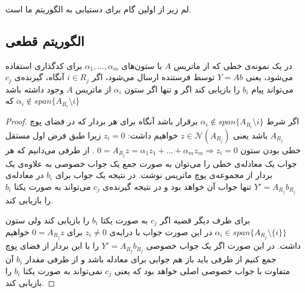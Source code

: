 \subsubsection{}
لم زیر از
\cite{7176784}
اولین گام برای دستیابی به الگوریتم ما است.
\subsection{
	الگوریتم قطعی
	}
\begin{lemma}
	\label{lemma:algebraicconstraint}
	در یک نمونه‌ی
	\picod
	خطی که از ماتریس
	$A$
	با ستون‌های 
	$\alpha_1, \ldots, \alpha_m$
	برای کدگذاری استفاده می‌شود، یعنی
	$Y = A b$
	توسط فرستنده ارسال می‌شود، اگر
	$i \in R_j$
	آنگاه، گیرنده‌‌ی 
	$c_j$
	می‌تواند پیام 
	$b_i$
	را بازیابی کند اگر و تنها اگر ستون
	$\alpha_i$
	از ماتریس
	$A$
	وجود داشته باشد که
	$\alpha_i \notin span\{A_{R_i} \setminus i\}$
\end{lemma}
\begin{proof}
	اگر شرط
		$\alpha_i \notin span\{A_{R_i} \setminus i\}$
		برقرار باشد آنگاه برای هر بردار که در فضای پوچ
		$A_{R_j}$
		باشد یعنی
		$z \in \mathcal{N}(A_{R_j})$
		خواهیم داشت:
		$z_i = 0$
		زیرا طبق فرض اول مستقل خطی بودن ستون
		$0 = A_{R_j} z  = \alpha_1 z_1 + \ldots + \alpha_m z_m \Rightarrow z_i = 0$
		.  از طرفی می‌دانیم که هر جواب یک معادله‌ی خطی را می‌توان به صورت جمع یک جواب خصوصی به علاوه‌ی یک بردار از مجموعه‌ی پوچ ماتریس نوشت. در نتیجه یک جواب برای 
		$b_i$
		در معادله‌ی
		$Y' = A_{R_j} b_{R_j}$
		تنها جواب آن خواهد بود و در نتیجه گیرنده‌ی
		$c_j$
		می‌تواند به صورت یکتا
		$b_i$
		را بازیابی کند.
		
		برای طرف دیگر قضیه اگر 
		$c_j$
		به صورت یکتا
		$b_i$
		را بازیابی کند ولی ستون
		$\alpha_i \in span\{A_{R_j} \setminus \{i\}\}$
		در این صورت جواب با درایه‌ی
		$z_i \neq 0$
		برای
		$0 = A_{R_j} z$
		خواهیم داشت. در این صورت اگر یک جواب خصوصی
				$Y' = A_{R_j} b_{R_j}$
				را با این بردار از فضای پوچ جمع کنیم از طرفی باید باز هم جوابی برای معادله باشد و از طرفی مقدار
				$b_i$
				آن متفاوت با جواب خصوصی اصلی خواهد بود که یعنی 
				$c_j$
				نمی‌تواند به صورت یکتا
				$b_i$
				را بازیابی کند.	
\end{proof}

